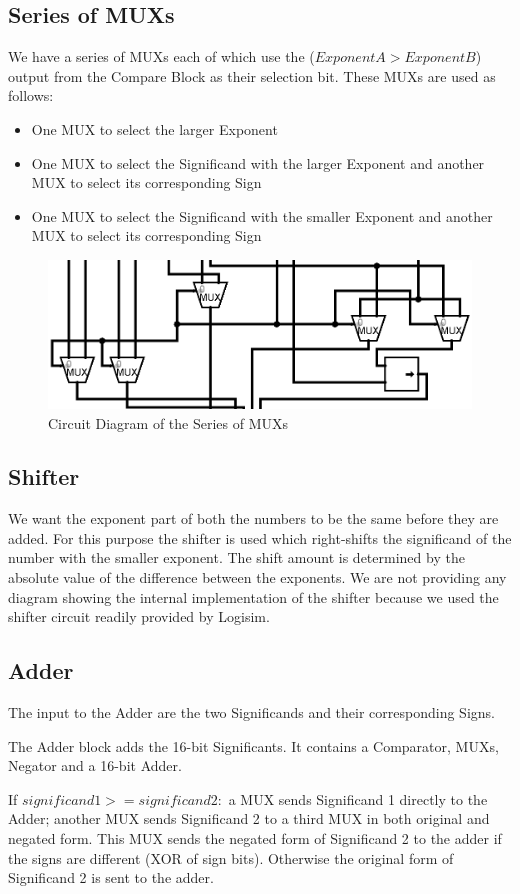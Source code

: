 \documentclass[12pt, a4paper]{article}
\begin{document}
	\subsection{Series of MUXs}
	We have a series of MUXs each of which use the ($Exponent A > Exponent B$)
	output from the Compare Block as their selection bit. These MUXs are used
	as follows:
	\begin{itemize}
		\item One MUX to select the larger Exponent
		\item One MUX to select the Significand with the larger Exponent and
		another MUX to select its corresponding Sign
		\item One MUX to select the Significand with the smaller Exponent and
		another
		MUX to select its corresponding Sign
	\end{itemize}
	\begin{figure}[h!]
		\centering
		\includegraphics[width = 0.7\linewidth]{mux}
		\caption{Circuit Diagram of the Series of MUXs}
		\label{fig6}
	\end{figure}
	\subsection{Shifter}
	We want the exponent part of both the numbers to be the same before they are
	added. For this purpose the shifter is used which right-shifts the
	significand of the number with the smaller exponent. The shift amount is
	determined by the absolute value of the difference between the exponents.
	We are not providing any diagram showing the internal implementation of the
	shifter because we used the shifter circuit readily provided by Logisim.
	\subsection{Adder}
	The input to the Adder are the two Significands and their corresponding
	Signs.

	The Adder block adds the 16-bit Significants. It contains a Comparator, MUXs, Negator and a 16-bit Adder.

	If $significand1 >= significand2:$ a MUX sends Significand 1 directly to
	the Adder; another MUX sends Significand 2 to a third MUX in both original
	and negated form. This MUX sends the negated form of Significand 2 to the
	adder if the signs are different (XOR of sign bits). Otherwise the original
	form of Significand 2 is sent to the adder.
\end{document}

